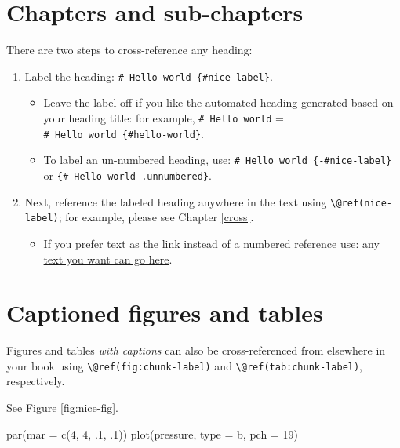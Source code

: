 \documentclass[
]{book}
\newenvironment{Shaded}{\begin{snugshade}}{\end{snugshade}}
\newcommand{\AttributeTok}[1]{\textcolor[rgb]{0.77,0.63,0.00}{#1}}
\newcommand{\DecValTok}[1]{\textcolor[rgb]{0.00,0.00,0.81}{#1}}
\newcommand{\FunctionTok}[1]{\textcolor[rgb]{0.00,0.00,0.00}{#1}}
\newcommand{\NormalTok}[1]{#1}
\newcommand{\StringTok}[1]{\textcolor[rgb]{0.31,0.60,0.02}{#1}}
\providecommand{\tightlist}{%
  \setlength{\itemsep}{0pt}\setlength{\parskip}{0pt}}
\theoremstyle{definition}
\theoremstyle{definition}
\theoremstyle{definition}
\theoremstyle{definition}
\theoremstyle{remark}
\begin{document}
\hypertarget{chapters-and-sub-chapters}{%
\section{Chapters and sub-chapters}\label{chapters-and-sub-chapters}}

There are two steps to cross-reference any heading:

\begin{enumerate}
\def\labelenumi{\arabic{enumi}.}
\tightlist
\item
  Label the heading: \texttt{\#\ Hello\ world\ \{\#nice-label\}}.

  \begin{itemize}
  \tightlist
  \item
    Leave the label off if you like the automated heading generated based on your heading title: for example, \texttt{\#\ Hello\ world} = \texttt{\#\ Hello\ world\ \{\#hello-world\}}.
  \item
    To label an un-numbered heading, use: \texttt{\#\ Hello\ world\ \{-\#nice-label\}} or \texttt{\{\#\ Hello\ world\ .unnumbered\}}.
  \end{itemize}
\item
  Next, reference the labeled heading anywhere in the text using \texttt{\textbackslash{}@ref(nice-label)}; for example, please see Chapter \ref{cross}.

  \begin{itemize}
  \tightlist
  \item
    If you prefer text as the link instead of a numbered reference use: \protect\hyperlink{cross}{any text you want can go here}.
  \end{itemize}
\end{enumerate}

\hypertarget{captioned-figures-and-tables}{%
\section{Captioned figures and tables}\label{captioned-figures-and-tables}}

Figures and tables \emph{with captions} can also be cross-referenced from elsewhere in your book using \texttt{\textbackslash{}@ref(fig:chunk-label)} and \texttt{\textbackslash{}@ref(tab:chunk-label)}, respectively.

See Figure \ref{fig:nice-fig}.

\begin{Shaded}
\begin{Highlighting}[]
\FunctionTok{par}\NormalTok{(}\AttributeTok{mar =} \FunctionTok{c}\NormalTok{(}\DecValTok{4}\NormalTok{, }\DecValTok{4}\NormalTok{, .}\DecValTok{1}\NormalTok{, .}\DecValTok{1}\NormalTok{))}
\FunctionTok{plot}\NormalTok{(pressure, }\AttributeTok{type =} \StringTok{\textquotesingle{}b\textquotesingle{}}\NormalTok{, }\AttributeTok{pch =} \DecValTok{19}\NormalTok{)}
\end{Highlighting}
\end{Shaded}
\end{document}
